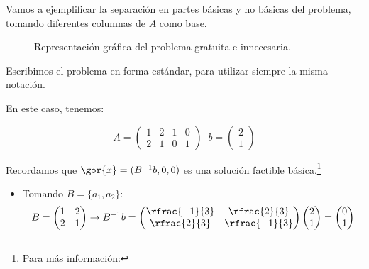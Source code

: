 \begin{example}
Vamos a ejemplificar la separación en partes básicas y no básicas del problema, tomando diferentes columnas de $A$ como base. 

\begin{ioprob}
\end{ioprob}

\begin{figure}[h]
\centering
{}
\caption{Representación gráfica del problema gratuita e innecesaria.}
\end{figure}

Escribimos el problema en forma estándar, para utilizar siempre la misma notación. 

\begin{ioprob}
\end{ioprob}

En este caso, tenemos:

\[A = \begin{pmatrix}1&2&1&0\\2&1&0&1\end{pmatrix}\;\; b = \begin{pmatrix}2\\1\end{pmatrix}\]

Recordamos que $\gor{x} = (B^{-1}b,0,0)$ es una solución factible básica.\footnote{Para más información: }

\begin{itemize}
	\item Tomando $B = \{a_1,a_2\}$:
		\[B = \begin{pmatrix}1&2\\2&1\end{pmatrix} \to B^{-1}b = \begin{pmatrix}\rfrac{-1}{3}&\rfrac{2}{3}\\\rfrac{2}{3}&\rfrac{-1}{3}\end{pmatrix}\begin{pmatrix}2\\1\end{pmatrix} = \begin{pmatrix}0\\1\end{pmatrix}\]


\end{itemize}
\end{example}
